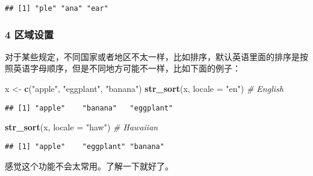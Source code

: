 \documentclass[]{article}
\newenvironment{Shaded}{\begin{snugshade}}{\end{snugshade}}
\newcommand{\CommentTok}[1]{\textcolor[rgb]{0.56,0.35,0.01}{\textit{#1}}}
\newcommand{\DataTypeTok}[1]{\textcolor[rgb]{0.13,0.29,0.53}{#1}}
\newcommand{\KeywordTok}[1]{\textcolor[rgb]{0.13,0.29,0.53}{\textbf{#1}}}
\newcommand{\NormalTok}[1]{#1}
\newcommand{\StringTok}[1]{\textcolor[rgb]{0.31,0.60,0.02}{#1}}
\begin{document}
\begin{verbatim}
## [1] "ple" "ana" "ear"
\end{verbatim}

\hypertarget{section-2}{%
\subsubsection{4 区域设置}\label{section-2}}

对于某些规定，不同国家或者地区不太一样，比如排序，默认英语里面的排序是按照英语字母顺序，但是不同地方可能不一样，比如下面的例子：

\begin{Shaded}
\begin{Highlighting}[]
\NormalTok{x <-}\StringTok{ }\KeywordTok{c}\NormalTok{(}\StringTok{"apple"}\NormalTok{, }\StringTok{"eggplant"}\NormalTok{, }\StringTok{"banana"}\NormalTok{)}
\KeywordTok{str_sort}\NormalTok{(x, }\DataTypeTok{locale =} \StringTok{"en"}\NormalTok{)  }\CommentTok{# English}
\end{Highlighting}
\end{Shaded}

\begin{verbatim}
## [1] "apple"    "banana"   "eggplant"
\end{verbatim}

\begin{Shaded}
\begin{Highlighting}[]
\KeywordTok{str_sort}\NormalTok{(x, }\DataTypeTok{locale =} \StringTok{"haw"}\NormalTok{) }\CommentTok{# Hawaiian}
\end{Highlighting}
\end{Shaded}

\begin{verbatim}
## [1] "apple"    "eggplant" "banana"
\end{verbatim}

感觉这个功能不会太常用。了解一下就好了。
\end{document}
